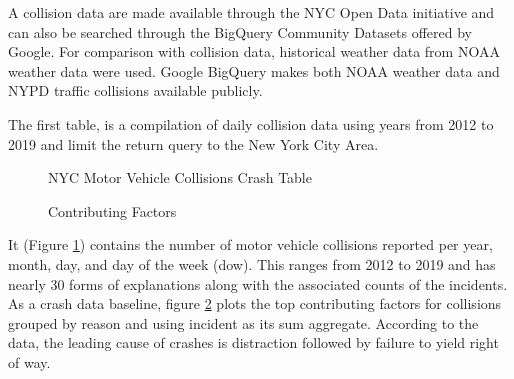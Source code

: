 \documentclass[conference]{IEEEtran}
\begin{document}
A collision data are made available through the NYC Open Data initiative and can also be searched through the BigQuery Community Datasets offered by Google. For comparison with collision data, historical weather data from NOAA weather data were used.  Google BigQuery makes both NOAA weather data and NYPD traffic collisions available publicly. 

The first table, is a compilation of daily collision data using years from 2012 to 2019 and limit the return query to the New York City Area. 
\begin{figure}[bth]
	\centering
	\caption{NYC Motor Vehicle Collisions Crash Table}
	\label{fig:mvtable}
\end{figure}
\begin{figure}[bth]
	\centering
	\caption{Contributing Factors}
	\label{fig:crashPlot}
\end{figure}
It (Figure \ref{fig:mvtable}) contains the number of motor vehicle collisions reported per year, month, day, and day of the week (dow). This ranges from 2012 to 2019 and has nearly 30 forms of explanations along with the associated counts of the incidents.  As a crash data baseline, figure \ref{fig:crashPlot} plots the top contributing factors for collisions grouped by reason and using incident as its sum aggregate. According to the data, the leading cause of crashes is distraction followed by failure to yield right of way. 
\end{document}
